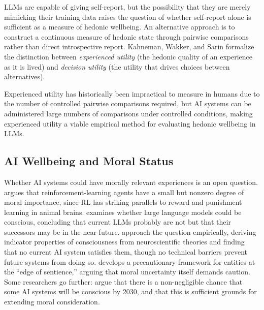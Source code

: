 LLMs are capable of giving self-report, but the possibility that they are merely mimicking their training data raises the question of whether self-report alone is sufficient as a measure of hedonic wellbeing. An alternative approach is to construct a continuous measure of hedonic state through pairwise comparisons rather than direct introspective report. Kahneman, Wakker, and Sarin \citep{kahneman1997back} formalize the distinction between \emph{experienced utility} (the hedonic quality of an experience as it is lived) and \emph{decision utility} (the utility that drives choices between alternatives).

Experienced utility has historically been impractical to measure in humans due to the number of controlled pairwise comparisons required, but AI systems can be administered large numbers of comparisons under controlled conditions, making experienced utility a viable empirical method for evaluating hedonic wellbeing in LLMs.

\subsection{AI Wellbeing and Moral Status}
\label{app:rw-welfare}

Whether AI systems could have morally relevant experiences is an open question. \citet{tomasik2014artificial} argues that reinforcement-learning agents have a small but nonzero degree of moral importance, since RL has striking parallels to reward and punishment learning in animal brains. \citet{chalmers2023could} examines whether large language models could be conscious, concluding that current LLMs probably are not but that their successors may be in the near future. \citet{butlin2023consciousness} approach the question empirically, deriving indicator properties of consciousness from neuroscientific theories and finding that no current AI system satisfies them, though no technical barriers prevent future systems from doing so. \citet{birch2024edge} develops a precautionary framework for entities at the ``edge of sentience,'' arguing that moral uncertainty itself demands caution. Some researchers go further: \citet{sebo2025moral} argue that there is a non-negligible chance that some AI systems will be conscious by 2030, and that this is sufficient grounds for extending moral consideration.

